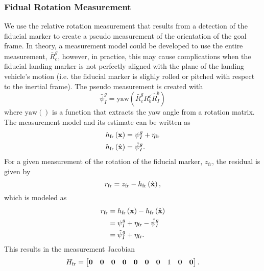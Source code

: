 \subsubsection{Fidual Rotation Measurement}
We use the relative rotation measurement that results from a detection of the
fiducial marker
to create a pseudo measurement of the orientation of the goal frame. In theory,
a measurement model could be developed to use the entire measurement,
$\bar{R}_c^g$, however, in practice, this may cause complications when the
fiducial landing marker is not perfectly aligned with the plane of the landing
vehicle's motion (i.e. the fiducial marker is slighly rolled or pitched with
respect to the inertial frame).
The pseudo
measurement is created with
\begin{equation}
  \bar{\psi}_I^g = \text{yaw} \left( \bar{R}_c^g R_b^c \hat{R}_I^b \right)
\end{equation}
where $\text{yaw}\left(\right)$ is a function that extracts the yaw angle
from a rotation matrix.
The measurement model and its estimate can
be written as
\begin{align}
  h_{\text{fr}} \left( \boldsymbol{\mathrm{x}} \right) &= \psi_I^g + \eta_{\text{fr}} \\
  h_{\text{fr}} \left( \hat{\boldsymbol{\mathrm{x}}} \right) &= \hat{\psi}_I^g.
\end{align}
For a given measurement of the rotation of the fiducial marker, $z_{\text{fr}}$,
the residual is given by
\begin{equation}
  r_{\text{fr}} = z_{\text{fr}} - h_{\text{fr}} \left( \hat{\boldsymbol{\mathrm{x}}} \right),
\end{equation}
which is modeled as
\begin{align}
  r_{\text{fr}} &= h_{\text{fr}} \left( \boldsymbol{\mathrm{x}} \right) - h_{\text{fr}} \left( \hat{\boldsymbol{\mathrm{x}}} \right) \\
                &= \psi_I^g + \eta_{\text{fr}} - \hat{\psi}_I^g \\
                &= \tilde{\psi}_I^g + \eta_{\text{fr}}.
\end{align}
This results in the measurement Jacobian
\begin{equation}
  H_{\text{fr}} =
  \begin{bmatrix}
    \boldsymbol{\mathrm{0}} & \boldsymbol{\mathrm{0}} & \boldsymbol{\mathrm{0}} &
    \boldsymbol{\mathrm{0}} & \boldsymbol{\mathrm{0}} & \boldsymbol{\mathrm{0}} & \boldsymbol{\mathrm{0}} & 1 & \boldsymbol{\mathrm{0}} & \boldsymbol{\mathrm{0}}
  \end{bmatrix}.
\end{equation}



